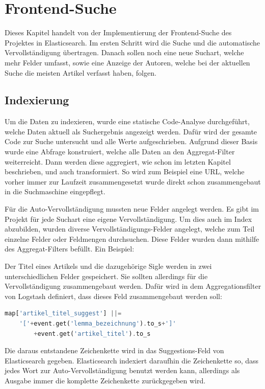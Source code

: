 \chapter{Frontend-Suche}

Dieses Kapitel handelt von der Implementierung der Frontend-Suche des Projektes in Elasticsearch. Im ersten Schritt wird die Suche und die automatische Vervollständigung übertragen. Danach sollen noch eine neue Suchart, welche mehr Felder umfasst, sowie eine Anzeige der Autoren, welche bei der aktuellen Suche die meisten Artikel verfasst haben, folgen.

\section{Indexierung}

Um die Daten zu indexieren, wurde eine statische Code-Analyse durchgeführt, welche Daten aktuell als Suchergebnis angezeigt werden. Dafür wird der gesamte Code zur Suche untersucht und alle Werte aufgeschrieben. Aufgrund dieser Basis wurde eine Abfrage konstruiert, welche alle Daten an den Aggregat-Filter weiterreicht. Dann werden diese aggregiert, wie schon im letzten Kapitel beschrieben, und auch transformiert. So wird zum Beispiel eine URL, welche vorher immer zur Laufzeit zusammengesetzt wurde direkt schon zusammengebaut in die Suchmaschine eingepflegt. 

Für die Auto-Vervollständigung mussten neue Felder angelegt werden. Es gibt im Projekt für jede Suchart eine eigene Vervollständigung. Um dies auch im Index abzubilden, wurden diverse Vervollständigungs-Felder angelegt, welche zum Teil einzelne Felder oder Feldmengen durchsuchen. Diese Felder wurden dann mithilfe des Aggregat-Filters befüllt. Ein Beispiel:

Der Titel eines Artikels und die dazugehörige Sigle werden in zwei unterschiedlichen Felder gespeichert. Sie sollten allerdings für die Vervollständigung zusammengebaut werden. Dafür wird in dem Aggregationsfilter von Logstash definiert, dass dieses Feld zusammengebaut werden soll:

\begin{lstlisting}[language=PHP, frame=single, label={lst:stringConcat}, caption=Zeichenketten-Konkatination im Aggregat Filter von Logstash ,captionpos=b] 
map['artikel_titel_suggest'] ||= 
    '['+event.get('lemma_bezeichnung').to_s+']'
        +event.get('artikel_titel').to_s
\end{lstlisting}
    
Die daraus entstandene Zeichenkette wird in das Suggestions-Feld von Elasticsearch gegeben. Elasticsearch indexiert daraufhin die Zeichenkette so, dass jedes Wort zur Auto-Vervollständigung benutzt werden kann, allerdings als Ausgabe immer die komplette Zeichenkette zurückgegeben wird.

